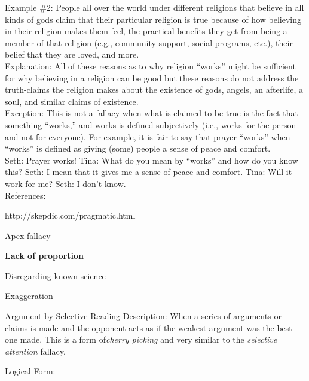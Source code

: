 \documentclass[a4paper,12pt,single,pdftex]{scrartcl}
\begin{document}
{    
      Example \#2: People all over the world under different religions that believe in all kinds of gods claim that their particular religion is true because of how believing in their religion makes them feel, the practical benefits they get from being a member of that religion (e.g., community support, social programs, etc.), their belief that they are loved, and more.
    \\

    
      Explanation: All of these reasons as to why religion “works” might be sufficient for why believing in a religion can be good  but these reasons do not address the truth-claims the religion makes about the existence of gods, angels, an afterlife, a soul, and similar claims of existence.
    \\

    
      Exception: This is not a fallacy when what is claimed to be true is the fact that something “works,” and works is defined subjectively (i.e., works for the person and not for everyone). For example, it is fair to say that prayer “works” when “works” is defined as giving (some) people a sense of peace and comfort.
    \\

    
      Seth: Prayer works! \newline
Tina: What do you mean by “works” and how do you know this? \newline
Seth: I mean that it gives me a sense of peace and comfort. \newline
Tina: Will it work for me? \newline
Seth: I don’t know.
    \\

    References:

    
      http://skepdic.com/pragmatic.html
    
  }


Apex fallacy\par \textbf{Lack of proportion}


Disregarding known science

Exaggeration

Argument by Selective Reading
    Description: When a series of arguments or claims is made and the opponent acts as if the weakest argument was the best one made. This is a form of{\it  cherry picking }and very similar to the {\it selective attention }fallacy.

    
      Logical Form:
    \\
\end{document}
